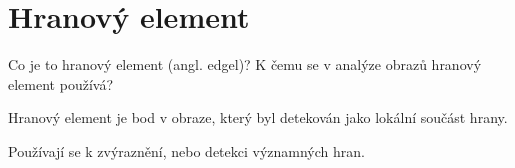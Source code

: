 \section{Hranový element}
Co je to hranový element (angl. edgel)? K čemu se v analýze obrazů hranový element používá? 

Hranový element je bod v obraze, který byl detekován jako lokální součást hrany.

Používají se k zvýraznění, nebo detekci významných hran.